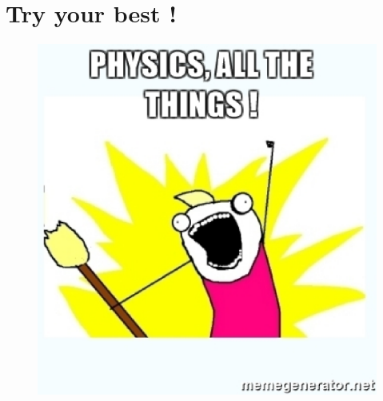 \documentclass[a4paper,oneside,11pt]{article}
\begin{document}
\section{Try your best !}
\begin{figure}[!h]
\centering
\includegraphics[scale=0.6]{./figure/fig0.eps}
\end{figure}
\end{document}
